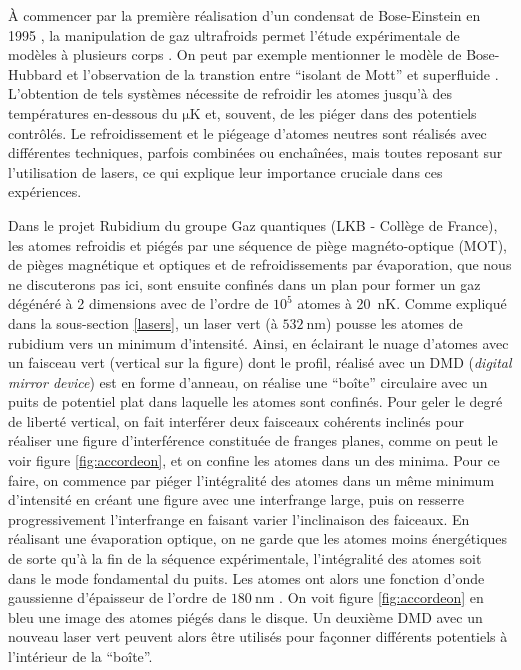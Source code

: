 \documentclass[11pt,a4paper]{article}
\newcommand{\lmbd}[1]{$\SI{#1}{\nano\metre}$}
\begin{document}
À commencer par la première réalisation d'un condensat de Bose-Einstein en 1995 \citep{anderson, davis}, la manipulation de gaz ultrafroids permet l'étude expérimentale de modèles à plusieurs corps \citep{bloch}. On peut par exemple mentionner le modèle de Bose-Hubbard et l'observation de la transtion entre ``isolant de Mott'' et superfluide \citep{greiner}. L'obtention de tels systèmes nécessite de refroidir les atomes jusqu'à des températures en-dessous du $\unit{\micro\kelvin}$ et, souvent, de les piéger dans des potentiels contrôlés. Le refroidissement et le piégeage d'atomes neutres sont réalisés avec différentes techniques, parfois combinées ou enchaînées, mais toutes reposant sur l'utilisation de lasers, ce qui explique leur importance cruciale dans ces expériences.


Dans le projet Rubidium du groupe Gaz quantiques (LKB - Collège de France), les atomes refroidis et piégés par une séquence de piège magnéto-optique (MOT), de pièges magnétique et optiques et de refroidissements par évaporation, que nous ne discuterons pas ici, sont ensuite confinés dans un plan pour former un gaz dégénéré à 2 dimensions avec de l'ordre de $10^5$ atomes à \SI{20}{nK}. Comme expliqué dans la sous-section \ref{lasers}, un laser vert (à \lmbd{532}) pousse les atomes de rubidium vers un minimum d'intensité. 
Ainsi, en éclairant le nuage d'atomes avec un faisceau vert (vertical sur la figure) dont le profil, réalisé avec un DMD (\textit{digital mirror device}) est en forme d'anneau, on réalise une ``boîte'' circulaire avec un puits de potentiel plat dans laquelle les atomes sont confinés. Pour geler le degré de liberté vertical, on fait interférer deux faisceaux cohérents inclinés pour réaliser une figure d'interférence constituée de franges planes, comme on peut le voir figure \ref{fig:accordeon}, et on confine les atomes dans un des minima. Pour ce faire, on commence par piéger l'intégralité des atomes dans un même minimum d'intensité en créant une figure avec une interfrange large, puis on resserre progressivement l'interfrange en faisant varier l'inclinaison des faiceaux. En réalisant une évaporation optique, on ne garde que les atomes moins énergétiques de sorte qu'à la fin de la séquence expérimentale, l'intégralité des atomes soit dans le mode fondamental du puits. Les atomes ont alors une fonction d'onde gaussienne d'épaisseur de l'ordre de \lmbd{180} \citep{brice}. On voit figure \ref{fig:accordeon} en bleu une image des atomes piégés dans le disque. Un deuxième DMD avec un nouveau laser vert peuvent alors être utilisés pour façonner différents potentiels à l'intérieur de la ``boîte''.
\end{document}
